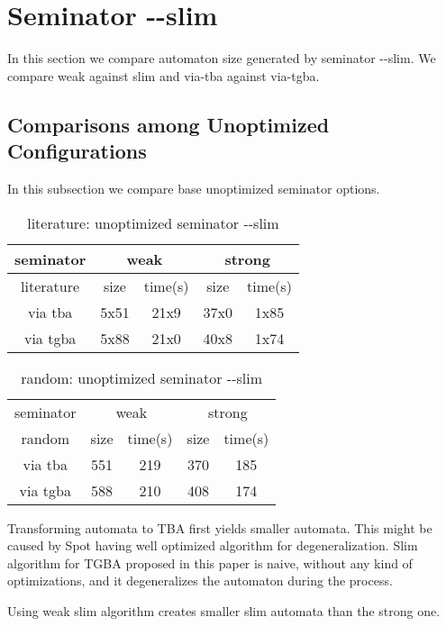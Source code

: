 \documentclass[
	digital
nolof, nolot
]{fithesis3}
\begin{document}
	
	\section{Seminator -\/-slim}
	In this section we compare automaton size generated by seminator -{}-slim.
	We compare weak against slim and via-tba against via-tgba.
	\subsection{Comparisons among Unoptimized Configurations}
	In this subsection we compare base unoptimized seminator options.
\begin{table}[ht]
	\centering
	\caption{literature: unoptimized seminator -\/-slim}
		\begin{tabular}{ |c||c|c|c|c| } 
			\hline
			seminator&\multicolumn{2}{c|}{weak}&\multicolumn{2}{c|}{strong} \\
			\hline
			literature&size&time(s)&size&time(s)\\
			\hhline{|=====|}
			
			via tba&5x51&21x9& 37x0 &1x85\\
			\hline
			via tgba&5x88&21x0& 40x8&1x74\\ 
			\hline
		\end{tabular}
\end{table}
	
	
	\begin{table}[ht]
		\centering
		\caption{random: unoptimized seminator -\/-slim}
		\begin{tabular}{ |c||c|c|c|c| } 
			\hline
			seminator&\multicolumn{2}{c|}{weak}&\multicolumn{2}{c|}{strong} \\
			\hhline{|=====|}
			random&size&time(s)&size&time(s)\\
			\hline
			via tba&551&219& 370 &185\\
			\hline
			via tgba&588&210& 408&174\\ 
			\hline
		\end{tabular}
\end{table}
	
	
	Transforming automata to TBA first yields smaller automata. This might be caused by Spot having well optimized algorithm for degeneralization. Slim algorithm for TGBA proposed in this paper is naive, without any kind of optimizations, and it degeneralizes the automaton during the process.
	
	Using weak slim algorithm creates smaller slim automata than the strong one. 
\end{document}
